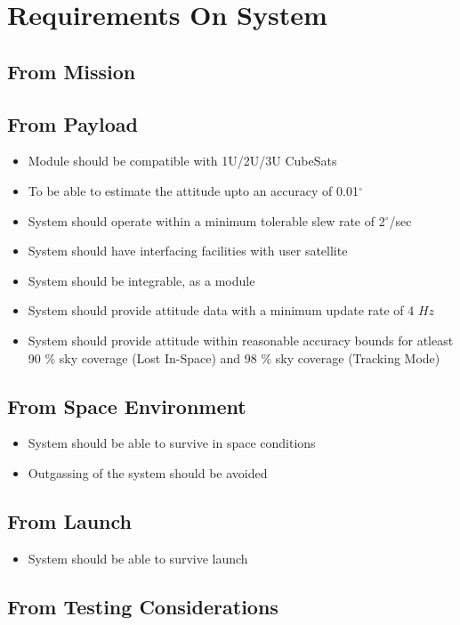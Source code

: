 \documentclass[../../main.tex]{subfiles}
\begin{document}
\chapter{Requirements On System}
\thispagestyle{fancy}


\section{From Mission}


\section{From Payload}
\begin{itemize}
    \item Module should be compatible with 1U/2U/3U CubeSats
    \item To be able to estimate the attitude upto an accuracy of 0.01$^\circ$
    \item System should operate within a minimum tolerable slew rate of 2$^\circ$/sec
    \item System should have interfacing facilities with user satellite
    \item System should be integrable, as a module
    \item System should provide attitude data with a minimum update rate of 4 $Hz$
    \item System should provide attitude within reasonable accuracy bounds for atleast 90 \% sky coverage (Lost In-Space) and 98 \% sky coverage (Tracking Mode)
\end{itemize}
\section{From Space Environment}
\begin{itemize}
    \item System should be able to survive in space conditions
    \item Outgassing of the system should be avoided
\end{itemize}
\section{From Launch}
\begin{itemize}
    \item System should be able to survive launch
\end{itemize}

\section{From Testing Considerations}
\end{document}

